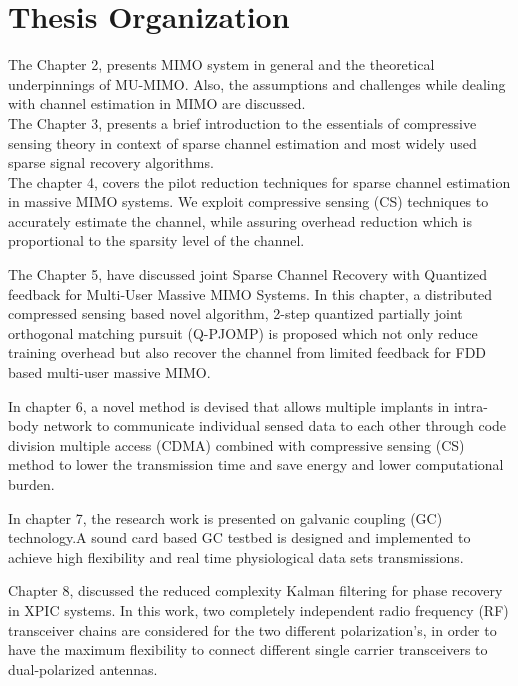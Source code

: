 \section{Thesis Organization}
{The Chapter 2}, presents MIMO system in general and the theoretical underpinnings of MU-MIMO. Also, the assumptions and challenges while dealing with channel estimation in  MIMO are discussed.\\
{The Chapter 3}, presents a brief introduction to the essentials of compressive sensing theory in context of sparse channel estimation and most widely used sparse signal recovery algorithms.\\
{The chapter 4}, covers the pilot reduction techniques for sparse channel estimation in massive MIMO systems. We exploit compressive sensing (CS) techniques to accurately estimate the channel, while assuring overhead reduction which is proportional to the sparsity level of the channel. 

{The Chapter 5}, have discussed joint Sparse Channel Recovery with Quantized feedback for Multi-User Massive MIMO Systems. In this chapter, a distributed compressed sensing based novel algorithm, 2-step quantized partially joint orthogonal matching pursuit (Q-PJOMP) is proposed which not only reduce training overhead but also recover the channel from limited feedback for FDD based multi-user massive MIMO.

{In chapter 6}, a novel method is  devised that allows multiple implants in intra-body network to communicate individual sensed data to each other through code division multiple access (CDMA) combined with compressive sensing (CS) method to lower the transmission time and save energy and lower computational burden.

{In chapter 7}, the research work is presented on galvanic coupling (GC) technology.A sound card based GC testbed is designed and implemented to achieve  high flexibility and real time physiological data sets transmissions.

{Chapter 8}, discussed the reduced complexity Kalman filtering for phase recovery in XPIC systems. In this work, two completely independent radio frequency (RF) transceiver chains are considered for the two different polarization's, in order to have the maximum flexibility to connect different single carrier transceivers to dual-polarized antennas.\\

